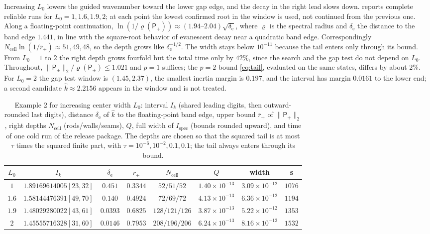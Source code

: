 Increasing $L_0$ lowers the guided wavenumber toward the lower gap edge, and the
decay in the right lead slows down.  reports complete reliable
runs for $L_0=1,1.6,1.9,2$; at each point the lowest confirmed root in the window
is used, not continued from the previous one. Along a floating-point continuation,
$\ln(1/\varrho(\mathsf P_+))\approx(1.94\text{--}2.04)\sqrt{\delta_{\mathrm e}}$, where $\varrho$ is the
spectral radius and $\delta_{\mathrm e}$ the distance to the band edge $1.441$, in line with the square-root behavior of
evanescent decay near a quadratic band edge. Correspondingly
$N_{\mathrm{cell}}\ln(1/\overline r_+)\approx51,49,48$, so the depth grows like
$\delta_{\mathrm e}^{-1/2}$. The width stays below $10^{-11}$
because the tail enters only through its bound. From $L_0=1$ to $2$ the right
depth grows fourfold but the total time only by $42\%$, since the search and the
gap test do not depend on $L_0$. Throughout,
$\|\mathsf P_\pm\|_2/\varrho(\mathsf P_\pm)\le1.021$ and $p=1$ suffices; the $p=2$
bound \eqref{eq:tail}, evaluated on the same states, differs by about $2\%$. For
$L_0=2$ the gap test window is $(1.45,2.37)$, the smallest inertia margin is
$0.197$, and the interval has margin $0.0161$ to the lower end; a second
candidate $\widehat k\approx2.2156$ appears in the window and is not treated.

\begin{table}[tbhp]
\caption{Example 2 for increasing center width $L_0$: interval $I_k$ (shared
leading digits, then outward-rounded last digits), distance $\delta_{\mathrm e}$ of
$\widehat k$ to the floating-point band edge, upper bound $\overline r_+$ of
$\|\mathsf P_+\|_2$, right depths $N_{\mathrm{cell}}$ (rods/walls/seams), $Q$, full
width of $I_{\mathrm{spec}}$ (bounds rounded upward), and time of one cold run of the release package. The depths are chosen so that the
squared tail is at most $\tau$ times the squared finite part, with
$\tau=10^{-6},10^{-2},0.1,0.1$; the tail always enters through its bound.}
\label{tab:ex2}
\centering\footnotesize\setlength{\tabcolsep}{3pt}
\begin{tabular}{cccccccc}
\toprule
$L_0$ & $I_k$ & $\delta_{\mathrm e}$ & $\overline r_+$ & $N_{\mathrm{cell}}$ & $Q$ & width & s\\
\midrule
$1$   & $1.89169614005[23,32]$ & $0.451$  & $0.3344$ & $52/51/52$ & $1.40\times10^{-13}$ & $3.09\times10^{-12}$ & $1076$\\
$1.6$ & $1.58144476391[49,70]$ & $0.140$  & $0.4924$ & $72/69/72$ & $4.13\times10^{-13}$ & $6.36\times10^{-12}$ & $1194$\\
$1.9$ & $1.48029280022[43,61]$ & $0.0393$ & $0.6825$ & $128/121/126$ & $3.87\times10^{-13}$ & $5.22\times10^{-12}$ & $1353$\\
$2$   & $1.45555716328[31,60]$ & $0.0146$ & $0.7953$ & $208/196/206$ & $6.24\times10^{-13}$ & $8.16\times10^{-12}$ & $1532$\\
\bottomrule
\end{tabular}

\end{table}
